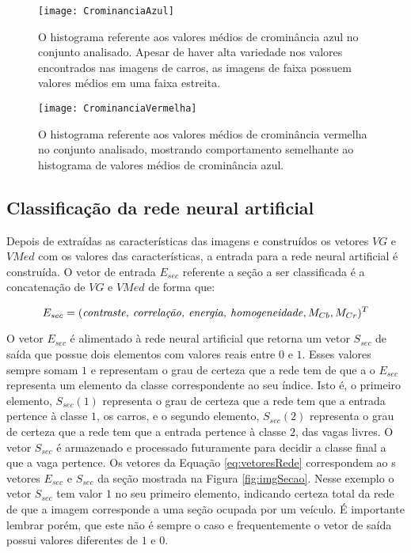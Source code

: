 \begin{figure}
	\centering
	\texttt{[image: CrominanciaAzul]}
	\caption{O histograma referente aos valores médios de crominância azul no conjunto analisado. Apesar de haver alta variedade nos valores encontrados nas imagens de carros, as imagens de faixa possuem valores médios em uma faixa estreita. }
		\label{fig:histCb}
	\centering
\end{figure}

\begin{figure}
	\centering
	\texttt{[image: CrominanciaVermelha]}
	\caption{O histograma referente aos valores médios de crominância vermelha no conjunto analisado, mostrando comportamento semelhante ao histograma de valores médios de crominância azul. }
		\label{fig:histCr}
	\centering
\end{figure}


\subsection{Classificação da rede neural artificial}

Depois de extraídas as características das imagens e construídos os vetores $VG$ e $VMed$ com os valores das características, a entrada para a rede neural artificial é construída. O vetor de entrada $E_{sec}$ referente a seção a ser classificada é a concatenação de $VG$ e $VMed$ de forma que:

\begin{equation}
	E_{sec} = (\text{\textit{contraste, correlação, energia, homogeneidade}}, M_{Cb}, M_{Cr})^T
\end{equation}

O vetor $E_{sec}$ é alimentado à rede neural artificial que retorna um vetor $S_{sec}$ de saída que possue dois elementos com valores reais entre $0$ e $1$. Esses valores sempre somam $1$ e representam o grau de certeza que a rede tem de que a o $E_{sec}$ representa um elemento da classe correspondente ao seu índice. Isto é, o primeiro elemento, $S_{sec}(1)$ representa o grau de certeza que a rede tem que a entrada pertence à classe $1$, os carros, e o segundo elemento, $S_{sec}(2)$ representa o grau de certeza que a rede tem que a entrada pertence à classe $2$, das vagas livres. O vetor $S_{sec}$ é armazenado e processado futuramente para decidir a classe final a que a vaga pertence. Os vetores da Equação \ref{eq:vetoresRede} correspondem ao s vetores $E_{sec}$ e $S_{sec}$ da seção mostrada na Figura \ref{fig:imgSecao}. Nesse exemplo o vetor $S_{sec}$ tem valor $1$ no seu primeiro elemento, indicando certeza total da rede de que a imagem corresponde a uma seção ocupada por um veículo. É importante lembrar porém, que este não é sempre o caso e frequentemente o vetor de saída possui valores diferentes de $1$ e $0$.

